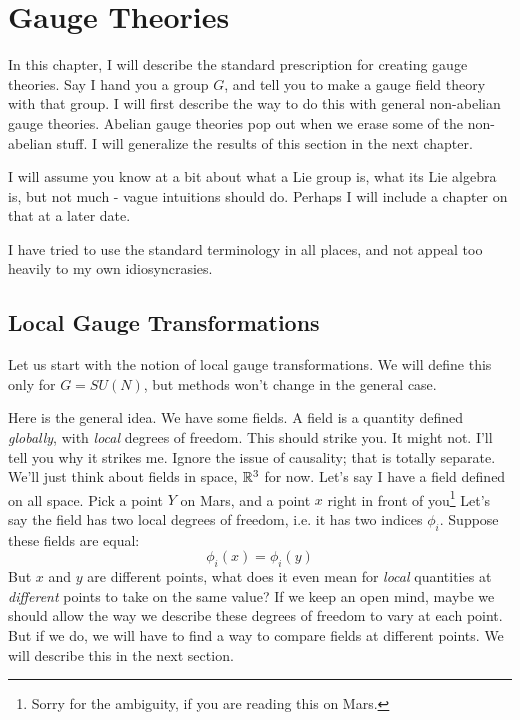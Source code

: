 \documentclass[main.tex]{subfiles}
\begin{document}
\chapter{Gauge Theories}
In this chapter, I will describe the standard prescription for creating gauge theories. Say I hand you a group $G$, and tell you to make a gauge field theory with that group. I will first describe the way to do this with general non-abelian gauge theories. Abelian gauge theories pop out when we erase some of the non-abelian stuff. I will generalize the results of this section in the next chapter.

I will assume you know at a bit about what a Lie group is, what its Lie algebra is, but not much - vague intuitions should do. Perhaps I will include a chapter on that at a later date.

I have tried to use the standard terminology in all places, and not appeal too heavily to my own idiosyncrasies.

\section{Local Gauge Transformations}
Let us start with the notion of local gauge transformations. We will define this only for $G = SU(N)$, but methods won't change in the general case.

Here is the general idea. We have some fields. A field is a quantity defined \textit{globally}, with \textit{local} degrees of freedom. This should strike you. It might not. I'll tell you why it strikes me. Ignore the issue of causality; that is totally separate. We'll just think about fields in space, $\mathbb{R}^3$ for now. Let's say I have a field defined on all space. Pick a point $Y$ on Mars, and a point $x$ right in front of you\footnote{Sorry for the ambiguity, if you are reading this on Mars.} Let's say the field has two local degrees of freedom, i.e. it has two indices $\phi_i$. Suppose these fields are equal:
\[
\phi_i (x) = \phi_i (y)
\]
But $x$ and $y$ are different points, what does it even mean for \textit{local} quantities at \textit{different} points to take on the same value? If we keep an open mind, maybe we should allow the way we describe these degrees of freedom to vary at each point. But if we do, we will have to find a way to compare fields at different points. We will describe this in the next section.
\end{document}
